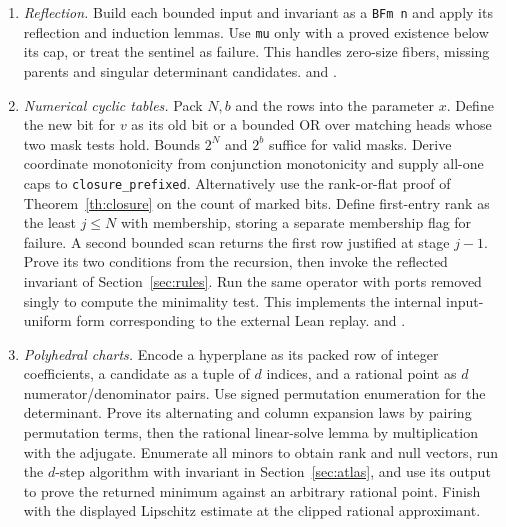 \begin{enumerate}
\item \emph{Reflection.} Build each bounded input and invariant as a \texttt{BFm n} and apply its reflection and induction lemmas. Use \texttt{mu} only with a proved existence below its cap, or treat the sentinel as failure. This handles zero-size fibers, missing parents and singular determinant candidates.  and .
\item \emph{Numerical cyclic tables.} Pack $N,b$ and the rows into the parameter $x$. Define the new bit for $v$ as its old bit or a bounded OR over matching heads whose two mask tests hold. Bounds $2^N$ and $2^b$ suffice for valid masks. Derive coordinate monotonicity from conjunction monotonicity and supply all-one caps to \texttt{closure\_prefixed}. Alternatively use the rank-or-flat proof of Theorem~\ref{th:closure} on the count of marked bits. Define first-entry rank as the least $j\le N$ with membership, storing a separate membership flag for failure. A second bounded scan returns the first row justified at stage $j-1$. Prove its two conditions from the recursion, then invoke the reflected invariant of Section~\ref{sec:rules}. Run the same operator with ports removed singly to compute the minimality test. This implements the internal input-uniform form corresponding to the external Lean replay.  and .
\item \emph{Polyhedral charts.} Encode a hyperplane as its packed row of integer coefficients, a candidate as a tuple of $d$ indices, and a rational point as $d$ numerator/denominator pairs. Use signed permutation enumeration for the determinant. Prove its alternating and column expansion laws by pairing permutation terms, then the rational linear-solve lemma by multiplication with the adjugate. Enumerate all minors to obtain rank and null vectors, run the $d$-step algorithm with invariant in Section~\ref{sec:atlas}, and use its output to prove the returned minimum against an arbitrary rational point. Finish with the displayed Lipschitz estimate at the clipped rational approximant.

\end{enumerate}

